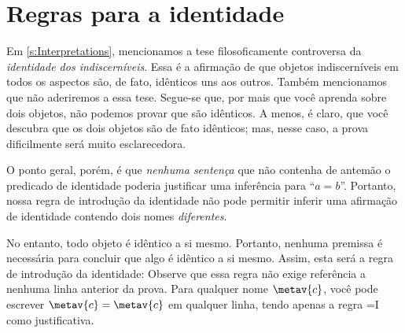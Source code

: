 \chapter{Regras para a identidade}
Em \cref{s:Interpretations}, mencionamos a tese filosoficamente controversa da \emph{identidade dos indiscerníveis}. Essa é a afirmação de que objetos indiscerníveis em todos os aspectos são, de fato, idênticos uns aos outros. Também mencionamos que não aderiremos a essa tese. Segue-se que, por mais que você aprenda sobre dois objetos, não podemos provar que são idênticos. A menos, é claro, que você descubra que os dois objetos são de fato idênticos; mas, nesse caso, a prova dificilmente será muito esclarecedora.

O ponto geral, porém, é que \emph{nenhuma sentença} que não contenha de antemão o predicado de identidade poderia justificar uma inferência para \textquotedblleft $a=b$\textquotedblright{}. Portanto, nossa regra de introdução da identidade não pode permitir inferir uma afirmação de identidade contendo dois nomes \emph{diferentes}.

No entanto, todo objeto é idêntico a si mesmo. Portanto, nenhuma premissa é necessária para concluir que algo é idêntico a si mesmo. Assim, esta será a regra de introdução da identidade:
Observe que essa regra não exige referência a nenhuma linha anterior da prova. Para qualquer nome $\metav{c}$, você pode escrever $\metav{c}=\metav{c}$ em qualquer linha, tendo apenas a regra {=}I como justificativa.

